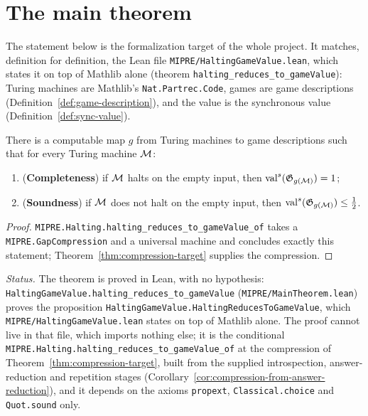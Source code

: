 \section{The main theorem}
\label{ch:main-theorem}

The statement below is the formalization target of the whole project. It matches,
definition for definition, the Lean file
\texttt{MIPRE/HaltingGameValue.lean}, which states it on top of Mathlib alone (theorem
\texttt{halting\_reduces\_to\_gameValue}): Turing machines are Mathlib's
\texttt{Nat.Partrec.Code}, games are game descriptions
(Definition~\ref{def:game-description}), and the value is the synchronous value
(Definition~\ref{def:sync-value}).

\begin{theorem}
\label{thm:main}
\leanok
There is a computable map $g$ from Turing machines to game descriptions such that for
every Turing machine $\mathcal{M}$:
\begin{enumerate}
\item (\textbf{Completeness}) if $\mathcal{M}$ halts on the empty input, then
  $\mathrm{val}^{s}(\mathfrak{G}_{g(\mathcal{M})}) = 1$;
\item (\textbf{Soundness}) if $\mathcal{M}$ does not halt on the empty input, then
  $\mathrm{val}^{s}(\mathfrak{G}_{g(\mathcal{M})}) \leq \tfrac12$.
\end{enumerate}
\end{theorem}

\begin{proof}
\leanok
\texttt{MIPRE.Halting.halting\_reduces\_to\_gameValue\_of} takes a
\texttt{MIPRE.GapCompression} and a universal machine and concludes exactly this statement;
Theorem~\ref{thm:compression-target} supplies the compression.
\end{proof}

\emph{Status.} The theorem is proved in Lean, with no hypothesis:
\texttt{HaltingGameValue.halting\_reduces\_to\_gameValue} (\texttt{MIPRE/MainTheorem.lean}) proves
the proposition \texttt{HaltingGameValue.HaltingReducesToGameValue}, which
\texttt{MIPRE/HaltingGameValue.lean} states on top of Mathlib alone. The proof cannot live in
that file, which imports nothing else; it is the conditional
\texttt{MIPRE.Halting.halting\_reduces\_to\_gameValue\_of} at the compression of
Theorem~\ref{thm:compression-target}, built from the supplied introspection, answer-reduction and
repetition stages (Corollary~\ref{cor:compression-from-answer-reduction}), and it depends on
the axioms \texttt{propext}, \texttt{Classical.choice} and \texttt{Quot.sound} only.

